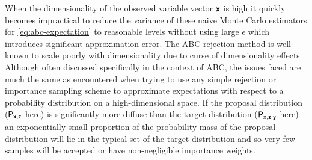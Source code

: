 When the dimensionality of the observed variable vector $\boldsymbol{\mathsf{x}}$ is high it quickly becomes impractical to reduce the variance of these naive Monte Carlo estimators for \eqref{eq:abc-expectation} to reasonable levels without using large $\epsilon$ which introduces significant approximation error. The \ac{ABC} rejection method is well known to scale poorly with dimensionality due to curse of dimensionality effects \citep{blum2010approximate,marin2012approximate,prangle2015summary}. Although often discussed specifically in the context of \ac{ABC}, the issues faced are much the same as encountered when trying to use any simple rejection or importance sampling scheme to approximate expectations with respect to a probability distribution on a high-dimensional space. If the proposal distribution ($\mathsf{P}_{\boldsymbol{\mathsf{x}},\boldsymbol{\mathsf{z}}}$ here) is significantly more diffuse than the target distribution ($\mathsf{P}_{\boldsymbol{\mathsf{x}},\boldsymbol{\mathsf{z}}|\boldsymbol{\mathsf{y}}}$ here) an exponentially small proportion of the probability mass of the proposal distribution will lie in the typical set of the target distribution and so very few samples will be accepted or have non-negligible importance weights.

